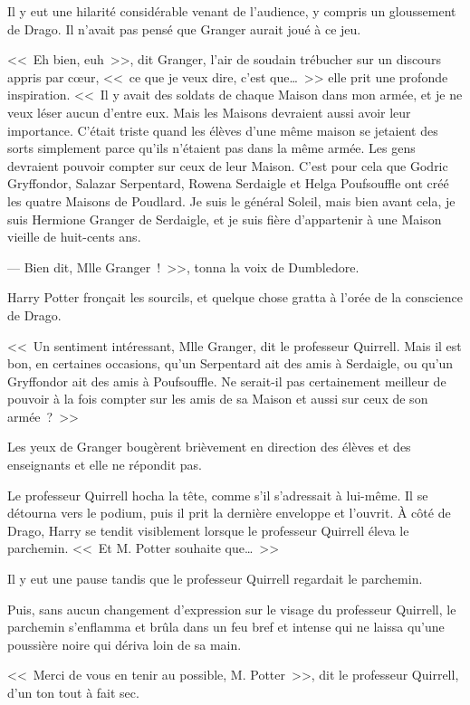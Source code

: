 Il y eut une hilarité considérable venant de l'audience, y compris un gloussement de Drago. Il n'avait pas pensé que Granger aurait joué à ce jeu.

<<~Eh bien, euh~>>, dit Granger, l'air de soudain trébucher sur un discours appris par cœur, <<~ce que je veux dire, c'est que…~>> elle prit une profonde inspiration. <<~Il y avait des soldats de chaque Maison dans mon armée, et je ne veux léser aucun d'entre eux. Mais les Maisons devraient aussi avoir leur importance. C'était triste quand les élèves d'une même maison se jetaient des sorts simplement parce qu'ils n'étaient pas dans la même armée. Les gens devraient pouvoir compter sur ceux de leur Maison. C'est pour cela que Godric Gryffondor, Salazar Serpentard, Rowena Serdaigle et Helga Poufsouffle ont créé les quatre Maisons de Poudlard. Je suis le général Soleil, mais bien avant cela, je suis Hermione Granger de Serdaigle, et je suis fière d'appartenir à une Maison vieille de huit-cents ans.

--- Bien dit, Mlle Granger~!~>>, tonna la voix de Dumbledore.

Harry Potter fronçait les sourcils, et quelque chose gratta à l'orée de la conscience de Drago.

<<~Un sentiment intéressant, Mlle Granger, dit le professeur Quirrell. Mais il est bon, en certaines occasions, qu'un Serpentard ait des amis à Serdaigle, ou qu'un Gryffondor ait des amis à Poufsouffle. Ne serait-il pas certainement meilleur de pouvoir à la fois compter sur les amis de sa Maison et aussi sur ceux de son armée~?~>>

Les yeux de Granger bougèrent brièvement en direction des élèves et des enseignants et elle ne répondit pas.

Le professeur Quirrell hocha la tête, comme s'il s'adressait à lui-même. Il se détourna vers le podium, puis il prit la dernière enveloppe et l'ouvrit. À côté de Drago, Harry se tendit visiblement lorsque le professeur Quirrell éleva le parchemin. <<~Et M. Potter souhaite que…~>>

Il y eut une pause tandis que le professeur Quirrell regardait le parchemin.

Puis, sans aucun changement d'expression sur le visage du professeur Quirrell, le parchemin s'enflamma et brûla dans un feu bref et intense qui ne laissa qu'une poussière noire qui dériva loin de sa main.

<<~Merci de vous en tenir au possible, M. Potter~>>, dit le professeur Quirrell, d'un ton tout à fait sec.

